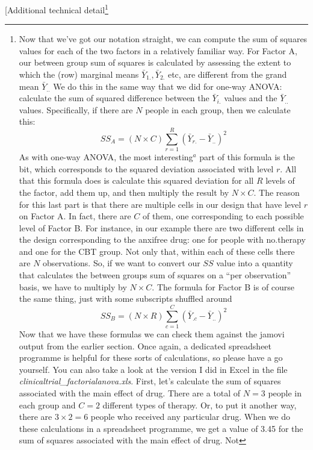 \documentclass[
  a4paper,
]{book}
\begin{document}
{[}Additional technical detail\footnote{Now that we've got our notation
  straight, we can compute the sum of squares values for each of the two
  factors in a relatively familiar way. For Factor A, our between group
  sum of squares is calculated by assessing the extent to which the
  (row) marginal means \(\bar{Y}_{1.} , \bar{Y}_{2.}\) etc, are
  different from the grand mean \(\bar{Y}_{..}\) We do this in the same
  way that we did for one-way ANOVA: calculate the sum of squared
  difference between the \(\bar{Y}_{i.}\) values and the
  \(\bar{Y}_{..}\) values. Specifically, if there are \(N\) people in
  each group, then we calculate this:
  \[SS_A=(N \times C)\sum_{r=1}^R (\bar{Y}_{r.}-\bar{Y}_{..})^2\] As
  with one-way ANOVA, the most interesting\(^a\) part of this formula is
  the bit, which corresponds to the squared deviation associated with
  level \(r\). All that this formula does is calculate this squared
  deviation for all \(R\) levels of the factor, add them up, and then
  multiply the result by \(N \times C\). The reason for this last part
  is that there are multiple cells in our design that have level \(r\)
  on Factor A. In fact, there are \(C\) of them, one corresponding to
  each possible level of Factor B. For instance, in our example there
  are two different cells in the design corresponding to the anxifree
  drug: one for people with no.therapy and one for the CBT group. Not
  only that, within each of these cells there are \(N\) observations.
  So, if we want to convert our \(SS\) value into a quantity that
  calculates the between groups sum of squares on a ``per observation''
  basis, we have to multiply by \(N \times C\). The formula for Factor B
  is of course the same thing, just with some subscripts shuffled around
  \[SS_B=(N \times R)\sum_{c=1}^C (\bar{Y}_{.c}-\bar{Y}_{..})^2\] Now
  that we have these formulas we can check them against the jamovi
  output from the earlier section. Once again, a dedicated spreadsheet
  programme is helpful for these sorts of calculations, so please have a
  go yourself. You can also take a look at the version I did in Excel in
  the file \emph{clinicaltrial\_factorialanova.xls}. First, let's
  calculate the sum of squares associated with the main effect of drug.
  There are a total of \(N = 3\) people in each group and \(C = 2\)
  different types of therapy. Or, to put it another way, there are
  \(3 \times 2 = 6\) people who received any particular drug. When we do
  these calculations in a spreadsheet programme, we get a value of 3.45
  for the sum of squares associated with the main effect of drug. Not
}
\end{document}
